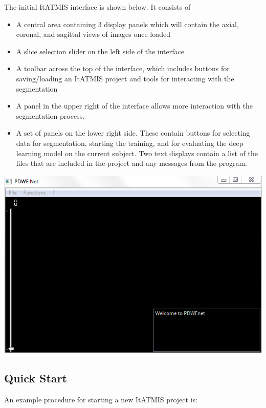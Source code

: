 \documentclass[twoside,a4paper]{refart}
\begin{document}
The initial ItATMIS interface is shown below. It consists of
\begin{itemize}
	\item A central area containing 3 display panels which will contain the axial, coronal, and sagittal views of images once loaded
	\item A slice selection slider on the left side of the interface
	\item A toolbar across the top of the interface, which includes buttons for saving/loading an ItATMIS project and tools for interacting with the segmentation
	\item A panel in the upper right of the interface allows more interaction with the segmentation process.
	\item A set of panels on the lower right side. These contain buttons for selecting data for segmentation, starting the training, and for evaluating the deep learning model on the current subject. Two text displays contain a list of the files that are included in the project and any messages from the program. 
\end{itemize}

\hspace{1cm}
\includegraphics[width=.8\textwidth]{InitialInterface.png}

\subsection{Quick Start}

An example procedure for starting a new ItATMIS project is:
\end{document}
